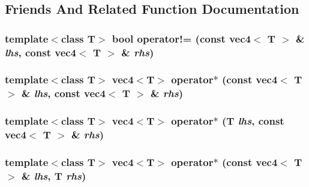 \subsection{Friends And Related Function Documentation}
\hypertarget{classnv_1_1vec4_7ebfb7c5815e8cec967b56c867105d29}{
\subsubsection[{operator!=}]{\setlength{\rightskip}{0pt plus 5cm}template$<$class T$>$ bool operator!= (const {\bf vec4}$<$ T $>$ \& {\em lhs}, \/  const {\bf vec4}$<$ T $>$ \& {\em rhs})}}
\label{classnv_1_1vec4_7ebfb7c5815e8cec967b56c867105d29}


\hypertarget{classnv_1_1vec4_636e2ea72649260c3f304e6262456491}{
\subsubsection[{operator$\ast$}]{\setlength{\rightskip}{0pt plus 5cm}template$<$class T$>$ {\bf vec4}$<$T$>$ operator$\ast$ (const {\bf vec4}$<$ T $>$ \& {\em lhs}, \/  const {\bf vec4}$<$ T $>$ \& {\em rhs})}}
\label{classnv_1_1vec4_636e2ea72649260c3f304e6262456491}


\hypertarget{classnv_1_1vec4_75870d1aa79efe3fb376f3b28052da06}{
\subsubsection[{operator$\ast$}]{\setlength{\rightskip}{0pt plus 5cm}template$<$class T$>$ {\bf vec4}$<$T$>$ operator$\ast$ (T {\em lhs}, \/  const {\bf vec4}$<$ T $>$ \& {\em rhs})}}
\label{classnv_1_1vec4_75870d1aa79efe3fb376f3b28052da06}


\hypertarget{classnv_1_1vec4_c8719df8fcfe7bd7c41d23018f00357f}{
\subsubsection[{operator$\ast$}]{\setlength{\rightskip}{0pt plus 5cm}template$<$class T$>$ {\bf vec4}$<$T$>$ operator$\ast$ (const {\bf vec4}$<$ T $>$ \& {\em lhs}, \/  T {\em rhs})}}
\label{classnv_1_1vec4_c8719df8fcfe7bd7c41d23018f00357f}


